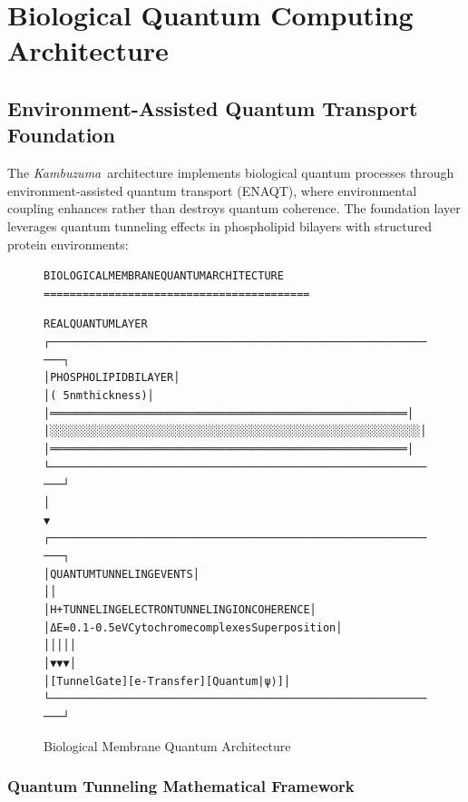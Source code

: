 \documentclass[11pt,a4paper]{article}
\newenvironment{asciiart}{\begin{alltt}}{\end{alltt}}
\newcommand{\kambuzuma}{\textit{Kambuzuma}}
\begin{document}
\section{Biological Quantum Computing Architecture}

\subsection{Environment-Assisted Quantum Transport Foundation}

The \kambuzuma\ architecture implements biological quantum processes through environment-assisted quantum transport (ENAQT), where environmental coupling enhances rather than destroys quantum coherence. The foundation layer leverages quantum tunneling effects in phospholipid bilayers with structured protein environments:

\begin{figure}[H]
\centering
\begin{asciiart}
BIOLOGICAL MEMBRANE QUANTUM ARCHITECTURE
=========================================

                    REAL QUANTUM LAYER
    ┌─────────────────────────────────────────────────────────────┐
    │                PHOSPHOLIPID BILAYER                         │
    │                   (~5nm thickness)                         │
    │  ═══════════════════════════════════════════════════════   │
    │  ░░░░░░░░░░░░░░░░░░░░░░░░░░░░░░░░░░░░░░░░░░░░░░░░░░░░░░░░░   │
    │  ═══════════════════════════════════════════════════════   │
    └─────────────────────────────────────────────────────────────┘
                                │
                                ▼
    ┌─────────────────────────────────────────────────────────────┐
    │              QUANTUM TUNNELING EVENTS                      │
    │                                                             │
    │  H+ TUNNELING        ELECTRON TUNNELING      ION COHERENCE │
    │  ΔE = 0.1-0.5 eV    Cytochrome complexes    Superposition  │
    │       │                      │                     │       │
    │       ▼                      ▼                     ▼       │
    │  [Tunnel Gate]         [e- Transfer]        [Quantum |ψ⟩]  │
    └─────────────────────────────────────────────────────────────┘
\end{asciiart}
\caption{Biological Membrane Quantum Architecture}
\end{figure}

\subsubsection{Quantum Tunneling Mathematical Framework}
\end{document}
